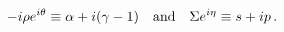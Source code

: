 \begin{equation}
-i\rho e^{i\theta} \equiv \alpha + i(\gamma-1)
\quad{\rm and}\quad
\Sigma e^{i\eta} \equiv s + ip   \, .
\label{polarfields}
\end{equation}

